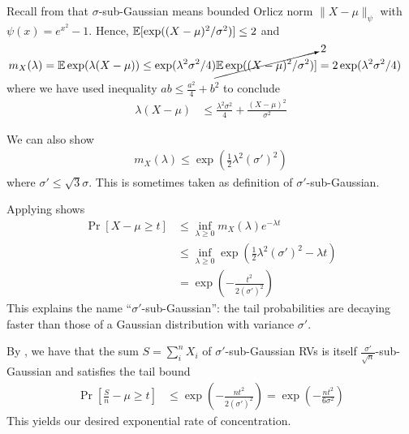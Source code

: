 \begin{example}\label{eg:sub-gaussian-chernoff}
    Recall from  that $\sigma$-sub-Gaussian means
    bounded Orlicz norm $\|X - \mu\|_\psi$ with $\psi(x) = e^{x^2} - 1$.
    Hence, $\mathbb{E}[\exp((X - \mu)^2 / \sigma^2)] \leq 2$ and
    \begin{align}
        m_X(\lambda)
        = \mathbb{E} \exp(\lambda (X - \mu))
        &\leq \exp(\lambda^2 \sigma^2 / 4) \cancelto{2}{\mathbb{E} \exp((X - \mu)^2 / \sigma^2)} ]
        = 2 \exp(\lambda^2 \sigma^2 / 4)
    \end{align}
    where we have used inequality $ab \leq \frac{a^2}{4} + b^2$ to conclude
    \begin{align}
        \lambda (X - \mu) &\leq \frac{\lambda^2 \sigma^2}{4} + \frac{(X - \mu)^2}{\sigma^2}
    \end{align}
    
    \begin{remark}
        We can also show
        \begin{align}
            m_X(\lambda)
            \leq \exp\left(\frac{1}{2} \lambda^2 (\sigma')^2\right)
        \end{align}
        where $\sigma' \leq \sqrt{3} \sigma$. This is sometimes taken as definition of $\sigma'$-sub-Gaussian.
    \end{remark}
    
    Applying  shows
    \begin{align}
        \Pr[X - \mu \geq t]
        &\leq \inf_{\lambda \geq 0} m_X(\lambda) e^{-\lambda t} \\
        &\leq \inf_{\lambda \geq 0} \exp\left( \frac{1}{2} \lambda^2 (\sigma')^2 - \lambda t \right) \\
        &= \exp\left( -\frac{t^2}{2 (\sigma')^2}\right)
    \end{align}
    This explains the name ``$\sigma'$-sub-Gaussian'': the tail probabilities are decaying faster than those of a Gaussian
    distribution with variance $\sigma'$.
    
    By , we have that the sum $S = \sum_i^n X_i$ of $\sigma'$-sub-Gaussian RVs
    is itself $\frac{\sigma'}{\sqrt{n}}$-sub-Gaussian and
    satisfies the tail bound
    \begin{align}
        \Pr\left[\frac{S}{n} - \mu \geq t\right]
        &\leq \exp\left( - \frac{n t^2}{2 (\sigma')^2} \right)
        = \exp\left( - \frac{n t^2}{6 \sigma^2} \right) \label{eq:sum-sub-gaussian-tail-bound}
    \end{align}
    This yields our desired exponential rate of concentration.
\end{example}

